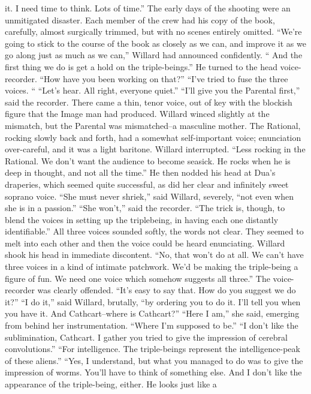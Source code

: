 \documentclass[a4paper,12pt]{article}
\begin{document}
it. I need time to think. Lots of time.”
The early days of the shooting were an unmitigated disaster. Each member of the crew had his
copy of the book, carefully, almost surgically trimmed, but with no scenes entirely omitted.
“We’re going to stick to the course of the book as closely as we can, and improve it as we go
along just as much as we can,” Willard had announced confidently. “ And the first thing we do is get a hold
on the triple-beings.”
He turned to the head voice-recorder. “How have you been working on that?”
“I’ve tried to fuse the three voices. “
“Let’s hear. All right, everyone quiet.”
“I’ll give you the Parental first,” said the recorder. There came a thin, tenor voice, out of key with
the blockish figure that the Image man had produced. Willard winced slightly at the mismatch, but the
Parental was mismatched--a masculine mother. The Rational, rocking slowly back and forth, had a
somewhat self-important voice; enunciation over-careful, and it was a light baritone.
Willard interrupted. “Less rocking in the Rational. We don’t want the audience to become seasick.
He rocks when he is deep in thought, and not all the time.”
He then nodded his head at Dua’s draperies, which seemed quite successful, as did her clear and
infinitely sweet soprano voice.
“She must never shriek,” said Willard, severely, “not even when she is in a passion.”
“She won’t,” said the recorder. “The trick is, though, to blend the voices in setting up the triplebeing,
in having each one distantly identifiable.”
All three voices sounded softly, the words not clear. They seemed to melt into each other and then
the voice could be heard enunciating.
Willard shook his head in immediate discontent. “No, that won’t do at all. We can’t have three
voices in a kind of intimate patchwork. We’d be making the triple-being a figure of fun. We need one voice
which somehow suggests all three.”
The voice-recorder was clearly offended. “It’s easy to say that. How do you suggest we do it?”
“I do it,” said Willard, brutally, “by ordering you to do it. I’ll tell you when you have it. And
Cathcart--where is Cathcart?”
“Here I am,” she said, emerging from behind her instrumentation. “Where I’m supposed to be.”
“I don’t like the sublimination, Cathcart. I gather you tried to give the impression of cerebral
convolutions.”
“For intelligence. The triple-beings represent the intelligence-peak of these aliens.”
“Yes, I understand, but what you managed to do was to give the impression of worms. You’ll have
to think of something else. And I don’t like the appearance of the triple-being, either. He looks just like a
\end{document}
